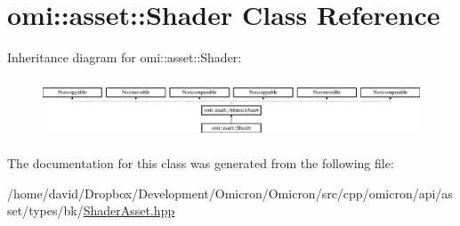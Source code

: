 \hypertarget{classomi_1_1asset_1_1_shader}{}\section{omi\+:\+:asset\+:\+:Shader Class Reference}
\label{classomi_1_1asset_1_1_shader}
Inheritance diagram for omi\+:\+:asset\+:\+:Shader\+:\begin{figure}[H]
\begin{center}
\leavevmode
\includegraphics[height=1.772152cm]{classomi_1_1asset_1_1_shader}
\end{center}
\end{figure}


The documentation for this class was generated from the following file\+:\begin{DoxyCompactItemize}
\item 
/home/david/\+Dropbox/\+Development/\+Omicron/\+Omicron/src/cpp/omicron/api/asset/types/bk/\hyperlink{_shader_asset_8hpp}{Shader\+Asset.\+hpp}\end{DoxyCompactItemize}
